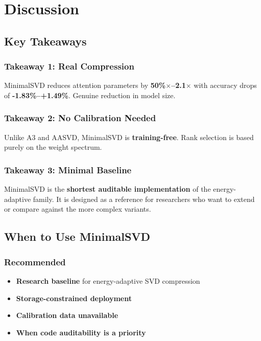 
\section{Discussion}

\subsection{Key Takeaways}

\subsubsection{Takeaway 1: Real Compression}

MinimalSVD reduces attention parameters by \textbf{50\%$\times$--2.1$\times$} with 
accuracy drops of \textbf{-1.83\%--+1.49\%}. Genuine reduction in model 
size.

\subsubsection{Takeaway 2: No Calibration Needed}

Unlike A3 and AASVD, MinimalSVD is \textbf{training-free}. Rank selection is based 
purely on the weight spectrum.

\subsubsection{Takeaway 3: Minimal Baseline}

MinimalSVD is the \textbf{shortest auditable implementation} of the energy-adaptive 
family. It is designed as a reference for researchers who want to extend or 
compare against the more complex variants.

\subsection{When to Use MinimalSVD}

\subsubsection{Recommended}

\begin{itemize}
\item \textbf{Research baseline} for energy-adaptive SVD compression
\item \textbf{Storage-constrained deployment}
\item \textbf{Calibration data unavailable}
\item \textbf{When code auditability is a priority}

\end{itemize}
